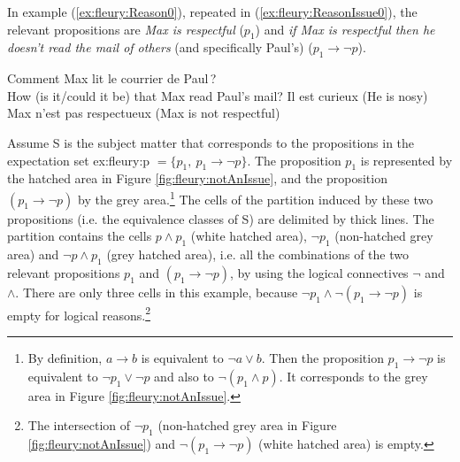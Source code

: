 \documentclass[output=paper,colorlinks,citecolor=brown,
]{langscibook}
\begin{document}
In example (\ref{ex:fleury:Reason0}),
repeated in (\ref{ex:fleury:ReasonIssue0}), the relevant propositions are \textit{Max is respectful} ($p_1$) and \textit{if Max is respectful then he doesn't read the mail of others} (and specifically Paul's) ($p_1 \rightarrow \neg p$).
\begin{exe}
\ex\label{ex:fleury:ReasonIssue0}
\begin{xlist}
  \ex\label{ex:fleury:ReasonIssue1} Comment Max lit le courrier de Paul\,?\\
  How (is it/could it be) that Max read Paul's mail?
  \ex\label{ex:fleury:ReasonIssue2} Il est curieux (He is nosy)
  \ex\label{ex:fleury:ReasonIssue3} Max n'est pas respectueux (Max is not respectful)
\end{xlist}
\end{exe}

Assume {S}  is the subject matter that corresponds to the propositions in the expectation set {ex:fleury:p $=\{p_1,~p_1 \rightarrow \neg p\}$}.
The proposition $p_1$ is represented by the hatched area in Figure \ref{fig:fleury:notAnIssue}, and the proposition $(p_1 \rightarrow \neg p)$ by the grey area.\footnote{
By definition, $a\rightarrow{}b$ is equivalent to $\neg a \lor b$. Then the proposition $p_1\rightarrow \neg{}p$ is equivalent to $\neg p_1 \lor \neg p$ and also to $\neg(p_1 \land p)$. It corresponds to the grey area in Figure \ref{fig:fleury:notAnIssue}.}
The cells of the partition induced by these two propositions (i.e. the equivalence classes of S) are delimited by thick lines. The partition contains the cells $p \land p_1$ (white hatched area), $\neg p_1$ (non-hatched grey area) and $\neg p \land p_1$ (grey hatched area), i.e. all the combinations of the two relevant propositions $p_1$ and $(p_1\rightarrow \neg p)$, by using the logical connectives $\neg$ and~$\land$. There are only three cells in this example, because $\neg p_1 \land \neg (p_1\rightarrow \neg p)$ is empty for logical reasons.\footnote{The intersection of $\neg p_1$ (non-hatched grey area in Figure \ref{fig:fleury:notAnIssue}) and $\neg (p_1\rightarrow \neg p)$ (white hatched area) is empty.} 
\end{document}
